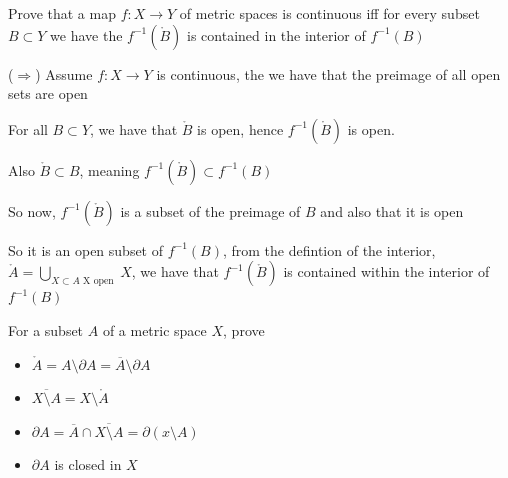 \documentclass{article}
\begin{document}
\begin{problem}
Prove that a map \( f \colon  X \to Y \) of metric spaces is continuous iff for every subset \( B \subset Y \) we have the \( f^{-1}(\mathring{B}) \) is contained in the interior of \( f^{-1}(B) \)

\begin{solution}
	(\( \Rightarrow \))
	Assume \( f: X \to Y \) is continuous, the we have that the preimage of all open sets are open

	For all \(  B \subset Y \), we have that \( \mathring{B} \) is open, hence \( f^{-1}(\mathring{B}) \) is open.

	Also \( \mathring{B} \subset B \), meaning \( f^{-1}(\mathring{B}) \subset f^{-1}(B) \)

	So now, \( f^{-1}(\mathring{B}) \) is a subset of the preimage of \( B \) and also that it is open

	So it is an open subset of \( f^{-1}(B) \), from the defintion of the interior, \( \mathring{A} = \bigcup_{X \subset A \text{ X open }}X \), we have that \( f^{-1}(\mathring{B}) \) is contained within the interior of \( f^{-1}(B) \)
\end{solution}
\end{problem}

\begin{problem}
For a subset \( A \) of a metric space \( X \), prove
\begin{itemize}
	\item \( \mathring{A} = A \setminus \partial A = \overline{A}\setminus \partial A \)
	\item \( \overline{X \setminus A} = X \setminus \mathring{A} \)
	\item \( \partial A = \overline{A} \cap \overline{X \setminus A} = \partial ( x \setminus A )  \)
	\item \( \partial A \) is closed in \( X \)
\end{itemize}
\end{problem}
\end{document}
